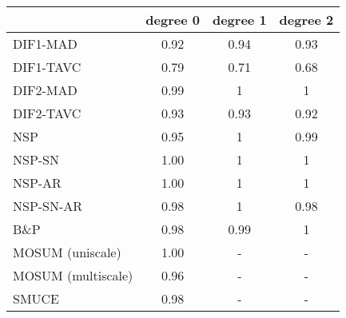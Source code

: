 \begin{tabular}{|l|c|c|c|}
  \hline
 & degree 0 & degree 1 & degree 2 \\ 
  \hline
DIF1-MAD & 0.92 & 0.94 & 0.93 \\ 
  DIF1-TAVC & 0.79 & 0.71 & 0.68 \\ 
  DIF2-MAD & 0.99 & 1 & 1 \\ 
  DIF2-TAVC & 0.93 & 0.93 & 0.92 \\ 
  NSP & 0.95 & 1 & 0.99 \\ 
  NSP-SN & 1.00 & 1 & 1 \\ 
  NSP-AR & 1.00 & 1 & 1 \\ 
  NSP-SN-AR & 0.98 & 1 & 0.98 \\ 
  B\&P & 0.98 & 0.99 & 1 \\ 
  MOSUM (uniscale) & 1.00 & - & - \\ 
  MOSUM (multiscale) & 0.96 & - & - \\ 
  SMUCE & 0.98 & - & - \\ 
   \hline
\end{tabular}
